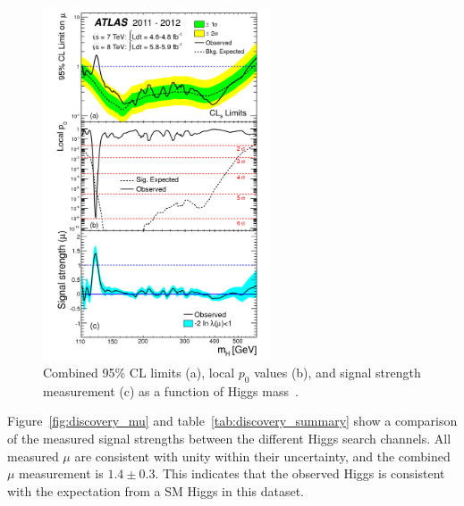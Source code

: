 \begin{figure}[h!]
  \centering
  \captionsetup{justification=centering}
  \includegraphics[width=0.6\textwidth]{figures/discovery_combined}
  \caption{Combined 95\% CL limits (a), local $p_0$ values (b), and signal strength measurement (c) as a function of Higgs mass~\cite{Discovery}.}
  \label{fig:discovery_combined}
\end{figure}

Figure~\ref{fig:discovery_mu} and table~\ref{tab:discovery_summary} show a comparison of the measured signal strengths between the different Higgs search channels. All measured $\mu$ are consistent with unity within their uncertainty, and the combined $\mu$ measurement is $1.4 \pm 0.3$. This indicates that the observed Higgs is consistent with the expectation from a SM Higgs in this dataset.  

